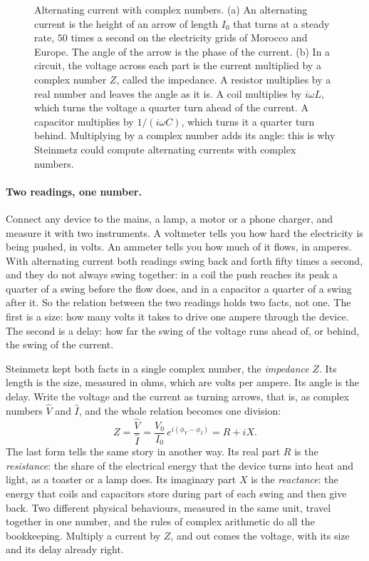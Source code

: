 \begin{figure}[tbp]
\caption[Alternating current with complex numbers]{Alternating current with complex numbers. (a) An alternating current is the height of an arrow of length $I_0$ that turns at a steady rate, $50$ times a second on the electricity grids of Morocco and Europe. The angle of the arrow is the phase of the current. (b) In a circuit, the voltage across each part is the current multiplied by a complex number $Z$, called the impedance. A resistor multiplies by a real number and leaves the angle as it is. A coil multiplies by $i\omega L$, which turns the voltage a quarter turn ahead of the current. A capacitor multiplies by $1/(i\omega C)$, which turns it a quarter turn behind. Multiplying by a complex number adds its angle: this is why Steinmetz could compute alternating currents with complex numbers.}
\label{fig:steinmetz}
\end{figure}

\paragraph{Two readings, one number.}
Connect any device to the mains, a lamp, a motor or a phone charger, and measure it with two instruments. A voltmeter tells you how hard the electricity is being pushed, in volts. An ammeter tells you how much of it flows, in amperes. With alternating current both readings swing back and forth fifty times a second, and they do not always swing together: in a coil the push reaches its peak a quarter of a swing before the flow does, and in a capacitor a quarter of a swing after it. So the relation between the two readings holds two facts, not one. The first is a size: how many volts it takes to drive one ampere through the device. The second is a delay: how far the swing of the voltage runs ahead of, or behind, the swing of the current.

Steinmetz kept both facts in a single complex number, the \emph{impedance} $Z$. Its length is the size, measured in ohms, which are volts per ampere. Its angle is the delay. Write the voltage and the current as turning arrows, that is, as complex numbers $\hat{V}$ and $\hat{I}$, and the whole relation becomes one division:
\[
Z = \frac{\hat{V}}{\hat{I}} = \frac{V_0}{I_0}\,e^{i(\phi_V - \phi_I)} = R + iX .
\]
The last form tells the same story in another way. Its real part $R$ is the \emph{resistance}: the share of the electrical energy that the device turns into heat and light, as a toaster or a lamp does. Its imaginary part $X$ is the \emph{reactance}: the energy that coils and capacitors store during part of each swing and then give back. Two different physical behaviours, measured in the same unit, travel together in one number, and the rules of complex arithmetic do all the bookkeeping. Multiply a current by $Z$, and out comes the voltage, with its size and its delay already right.

